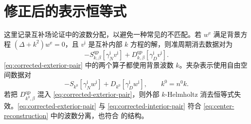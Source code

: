 \section{修正后的表示恒等式}
\label{app:corrected-identity}

这里记录互补场论证中的波数分配，以避免一种常见的不匹配。若 $w^{\mathrm e}$ 满足背景方程 $(\Delta+k^2)w^{\mathrm e}=0$，且 $v^{\mathrm i}$ 是互补内部 $k$ 方程的解，则准周期消去数据对为
\begin{equation}
  -S^{\mathrm{qp}}_{k,\beta}
  [\gamma_N^{\mathrm i}v^{\mathrm i}]
  +D^{\mathrm{qp}}_{k,\beta}
  [\gamma_D^{\mathrm i}v^{\mathrm i}].
  \label{eq:corrected-exterior-pair}
\end{equation}
\eqref{eq:corrected-exterior-pair} 中的两个算子都使用背景波数 $k$。夹杂表示使用自由空间数据对
\begin{equation}
  -S_{k^0}[\gamma_N^{\mathrm i}w^{\mathrm i}]
  +D_{k^0}[\gamma_D^{\mathrm i}w^{\mathrm i}],
  \qquad k^0=n^0k.
  \label{eq:corrected-interior-pair}
\end{equation}
若把 $D^{\mathrm{qp}}_{k^0,\beta}$ 混入 \eqref{eq:corrected-exterior-pair}，则外部 $k$-Helmholtz 消去恒等式失效。\eqref{eq:corrected-exterior-pair} 与 \eqref{eq:corrected-interior-pair} 符合 \eqref{eq:center-reconstruction} 中的波数分离，也符合 \cite[Appendix~A]{BarnettGreengard2010} 的结构。
